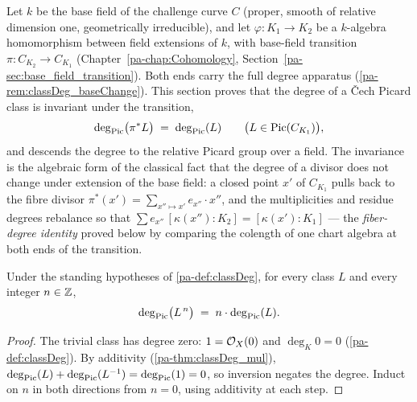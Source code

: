 Let \(k\) be the base field of the challenge curve \(C\) (proper, smooth of relative
dimension one, geometrically irreducible), and let \(\varphi : K_1 \to K_2\) be a
\(k\)-algebra homomorphism between field extensions of \(k\), with base-field transition
\(\pi : C_{K_2} \to C_{K_1}\)
(Chapter~\ref{pa-chap:Cohomology}, Section~\ref{pa-sec:base_field_transition}). Both ends carry
the full degree apparatus (\ref{pa-rem:classDeg_baseChange}). This section proves that the
degree of a \v Cech Picard class is invariant under the transition,
\[
  \deg_{\operatorname{Pic}}\bigl(\pi^{*}L\bigr) \;=\; \deg_{\operatorname{Pic}}(L)
  \qquad \bigl(L \in \operatorname{Pic}(C_{K_1})\bigr),
\]
and descends the degree to the relative Picard group over a field. The invariance is the
algebraic form of the classical fact that the degree of a divisor does not change under
extension of the base field: a closed point \(x'\) of \(C_{K_1}\) pulls back to the fibre
divisor \(\pi^{*}(x') = \sum_{x'' \mapsto x'} e_{x''} \cdot x''\), and the multiplicities
and residue degrees rebalance so that
\(\sum e_{x''}\,[\kappa(x'') : K_2] = [\kappa(x') : K_1]\) --- the \emph{fiber-degree
identity} proved below by comparing the colength of one chart algebra at both ends of
the transition.

\begin{lemma}
  \label{pa-lem:classDeg_zpow}
  \leanok

  Under the standing hypotheses of \ref{pa-def:classDeg}, for every class \(L\) and every
  integer \(n \in \mathbb{Z}\),
  \[
    \deg_{\operatorname{Pic}}\bigl(L^{\,n}\bigr) \;=\; n \cdot \deg_{\operatorname{Pic}}(L).
  \]
\end{lemma}
\begin{proof}
  \leanok
  The trivial class has degree zero: \(1 = \mathcal{O}_{X}(0)\) and \(\deg_K 0 = 0\)
  (\ref{pa-def:classDeg}). By additivity (\ref{pa-thm:classDeg_mul}),
  \(\deg_{\operatorname{Pic}}(L) + \deg_{\operatorname{Pic}}(L^{-1}) = \deg_{\operatorname{Pic}}(1) = 0\), so inversion negates
  the degree. Induct on \(n\) in both directions from \(n = 0\), using additivity at
  each step.
\end{proof}

